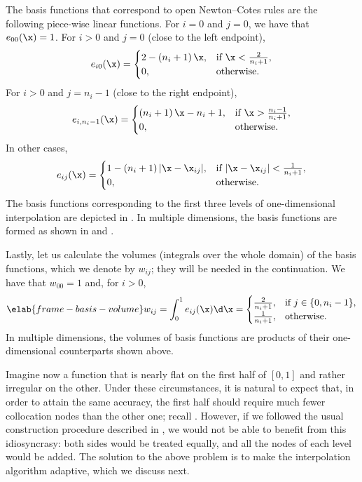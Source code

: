 The basis functions that correspond to open Newton--Cotes rules are the
following piece-wise linear functions. For $i = 0$ and $j = 0$, we have that
$e_{00}(\x) = 1$. For $i > 0$ and $j = 0$ (close to the left endpoint),
\[
  e_{i0}(\x) =
  \begin{cases}
    2 - \left(n_i + 1\right) \x, & \text{if } \x < \frac{2}{n_i + 1}, \\
    0, & \text{otherwise}.
  \end{cases}
\]
For $i > 0$ and $j = n_i - 1$ (close to the right endpoint),
\[
  e_{i, n_i - 1}(\x) =
  \begin{cases}
    \left(n_i + 1\right) \x - n_i + 1, & \text{if } \x > \frac{n_i - 1}{n_i + 1}, \\
    0, & \text{otherwise}.
  \end{cases}
\]
In other cases,
\[
  e_{ij}(\x) =
  \begin{cases}
    1 - \left(n_i + 1\right)|\x - \x_{ij}|, & \text{if } |\x - \x_{ij}| < \frac{1}{n_i + 1}, \\
    0, & \text{otherwise}.
  \end{cases}
\]
The basis functions corresponding to the first three levels of one-dimensional
interpolation are depicted in . In multiple dimensions, the
basis functions are formed as shown in  and
.

Lastly, let us calculate the volumes (integrals over the whole domain) of the
basis functions, which we denote by $w_{ij}$; they will be needed in the
continuation. We have that $w_{00} = 1$ and, for $i > 0$,
\begin{equation} \elab{frame-basis-volume}
  w_{ij} = \int_0^1 e_{ij}(\x) \d \x =
  \begin{cases}
    \frac{2}{n_i + 1}, & \text{if } j \in \{ 0, n_i - 1 \}, \\
    \frac{1}{n_i + 1}, & \text{otherwise}.
  \end{cases}
\end{equation}
In multiple dimensions, the volumes of basis functions are products of
their one-dimensional counterparts shown above.

Imagine now a function that is nearly flat on the first half of $[0, 1]$ and
rather irregular on the other. Under these circumstances, it is natural to
expect that, in order to attain the same accuracy, the first half should require
much fewer collocation nodes than the other one; recall .
However, if we followed the usual construction procedure described in
, we would not be able to benefit from this
idiosyncrasy: both sides would be treated equally, and all the nodes of each
level would be added. The solution to the above problem is to make the
interpolation algorithm adaptive, which we discuss next.

